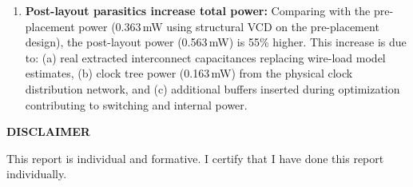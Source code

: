 \documentclass{article}
\begin{document}
\begin{tcolorbox}[colback=white, colframe=black, width=\textwidth, title=Answer 3.3]
\begin{enumerate}
\item \textbf{Post-layout parasitics increase total power:} Comparing with the pre-placement power (0.363\,mW using structural VCD on the pre-placement design), the post-layout power (0.563\,mW) is 55\% higher. This increase is due to: (a) real extracted interconnect capacitances replacing wire-load model estimates, (b) clock tree power (0.163\,mW) from the physical clock distribution network, and (c) additional buffers inserted during optimization contributing to switching and internal power.
\end{enumerate}

\end{tcolorbox}

\vspace{1cm}

\begin{center}
\textbf{DISCLAIMER}

\vspace{0.5cm}

This report is individual and formative. I certify that I have done this report individually.
\end{center}
\end{document}
